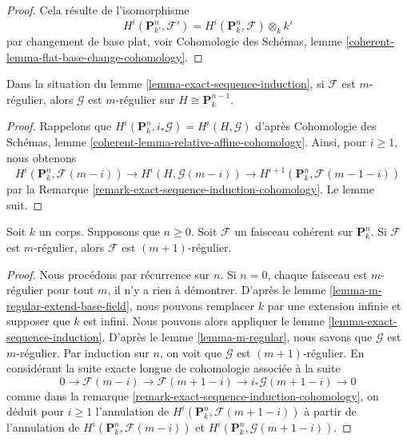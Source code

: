 \begin{proof}
Cela résulte de l'isomorphisme
$$
H^i(\mathbf{P}^n_{k'}, \mathcal{F}') =
H^i(\mathbf{P}^n_k, \mathcal{F}) \otimes_k k'
$$
par changement de base plat, voir Cohomologie des
Schémas, lemme \ref{coherent-lemma-flat-base-change-cohomology}.
\end{proof}

\begin{lemma}
\label{lemma-m-regular}
Dans la situation du lemme
\ref{lemma-exact-sequence-induction}, si $\mathcal{F}$ est $m$-régulier,
alors $\mathcal{G}$ est $m$-régulier sur $H \cong \mathbf{P}^{n - 1}_k$.
\end{lemma}

\begin{proof}
Rappelons que $H^i(\mathbf{P}^n_k, i_*\mathcal{G}) = H^i(H,
\mathcal{G})$ d'après Cohomologie des Schémas, lemme
\ref{coherent-lemma-relative-affine-cohomology}. Ainsi, pour $i \geq 1$, nous obtenons
$$
H^i(\mathbf{P}^n_k, \mathcal{F}(m - i)) \to
H^i(H, \mathcal{G}(m - i)) \to
H^{i + 1}(\mathbf{P}^n_k, \mathcal{F}(m - 1 - i))
$$
par la Remarque
\ref{remark-exact-sequence-induction-cohomology}. Le lemme suit.
\end{proof}

\begin{lemma}
\label{lemma-m-regular-up}
Soit $k$ un corps. Supposons que $n
\geq 0$. Soit $\mathcal{F}$ un faisceau cohérent
sur $\mathbf{P}^n_k$. Si $\mathcal{F}$ est
$m$-régulier, alors $\mathcal{F}$ est $(m + 1)$-régulier.
\end{lemma}

\begin{proof}
Nous procédons par récurrence sur $n$. Si $n = 0$, chaque
faisceau est $m$-régulier pour tout $m$, il n'y a rien à
démontrer. D'après le lemme
\ref{lemma-m-regular-extend-base-field}, nous pouvons remplacer $k$ par
une extension infinie et supposer que $k$ est infini. Nous pouvons alors
appliquer le lemme \ref{lemma-exact-sequence-induction}. D'après le lemme
\ref{lemma-m-regular}, nous savons que $\mathcal{G}$ est $m$-régulier.
Par induction sur $n$, on voit que $\mathcal{G}$ est $(m +
1)$-régulier. En considérant la suite exacte longue de cohomologie associée à la suite
$$
0 \to \mathcal{F}(m - i) \to \mathcal{F}(m + 1 - i)
\to i_*\mathcal{G}(m + 1 - i) \to 0
$$
comme dans la remarque
\ref{remark-exact-sequence-induction-cohomology}, on déduit
pour $i \geq 1$ l'annulation de $H^i(\mathbf{P}^n_k,
\mathcal{F}(m + 1 - i))$ à partir de l'annulation de
$H^i(\mathbf{P}^n_k, \mathcal{F}(m - i))$ et $H^i(\mathbf{P}^n_k, \mathcal{G}(m + 1 - i))$.
\end{proof}

